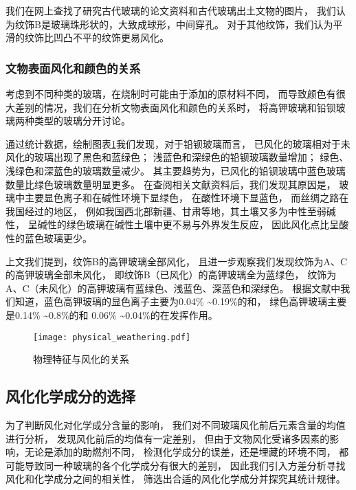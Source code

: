 \documentclass[withoutpreface,bwprint]{cumcmthesis} %
\begin{document}
我们在网上查找了研究古代玻璃的论文资料和古代玻璃出土文物的图片，
我们认为纹饰B是玻璃珠形状的，大致成球形，中间穿孔\cite{yunnanluliangxianxueguanbao}。
对于其他纹饰，我们认为平滑的纹饰比凹凸不平的纹饰更易风化\cite{zhanguojihandai}\cite{zhongguozhanhanqian}\cite{shanxilintongxinfeng}。

\subsubsection{文物表面风化和颜色的关系}

考虑到不同种类的玻璃，在烧制时可能由于添加的原材料不同，
而导致颜色有很大差别的情况，我们在分析文物表面风化和颜色的关系时，
将高钾玻璃和铅钡玻璃两种类型的玻璃分开讨论。

通过统计数据，绘制图表\ref{bb}我们发现，对于铅钡玻璃而言，
已风化的玻璃相对于未风化的玻璃出现了黑色和蓝绿色；
浅蓝色和深绿色的铅钡玻璃数量增加；
绿色、浅绿色和深蓝色的玻璃数量减少。
其主要趋势为，已风化的铅钡玻璃中蓝色玻璃数量比绿色玻璃数量明显更多。
在查阅相关文献资料后，我们发现其原因是，
玻璃中主要显色离子和在碱性环境下显绿色，
在酸性环境下显蓝色\cite{yijianzhanguoshiqibaleng}\cite{hunanyuanshuiliuyu}，
而丝绸之路在我国经过的地区，
例如我国西北部新疆、甘肃等地，其土壤又多为中性至弱碱性，
呈碱性的绿色玻璃在碱性土壤中更不易与外界发生反应，
因此风化点比呈酸性的蓝色玻璃更少。

上文我们提到，纹饰B的高钾玻璃全部风化，
且进一步观察我们发现纹饰为A、C的高钾玻璃全部未风化，
即纹饰B（已风化）的高钾玻璃全为蓝绿色，
纹饰为A、C（未风化）的高钾玻璃有蓝绿色、浅蓝色、深蓝色和深绿色。
根据文献中我们知道，蓝色高钾玻璃的显色离子主要为0.04\% \textasciitilde 0.19\%的和，
绿色高钾玻璃主要是0.14\% \textasciitilde 0.8\%的和
0.06\% \textasciitilde 0.04\%的在发挥作用\cite{wedepohl2010chemical}。


\begin{figure}[!h]
	\centering
	\texttt{[image: physical\_weathering.pdf]}
	\caption{物理特征与风化的关系}
	\label{bb}
\end{figure}


\subsection{风化化学成分的选择}

为了判断风化对化学成分含量的影响，
我们对不同玻璃风化前后元素含量的均值进行分析，
发现风化前后的均值有一定差别，
但由于文物风化受诸多因素的影响，无论是添加的助燃剂不同，
检测化学成分的误差，还是埋藏的环境不同，
都可能导致同一种玻璃的各个化学成分有很大的差别，
因此我们引入方差分析寻找风化和化学成分之间的相关性，
筛选出合适的风化化学成分并探究其统计规律。
\end{document}
